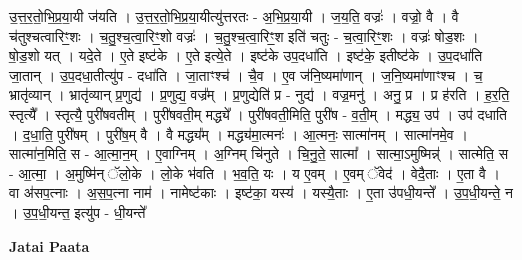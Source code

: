 \documentclass[17pt]{extarticle}
\begin{document}
उ॒त्त॒र॒तो॒भि॒प्र॒या॒यी ज॑यति । उ॒त्त॒र॒तो॒भि॒प्र॒या॒यीत्यु॑त्तरतः - अ॒भि॒प्र॒या॒यी । ज॒य॒ति॒ वज्रः॑ । वज्रो॒ वै । वै च॑तुश्चत्वारिꣳ॒॒शः । च॒तु॒श्च॒त्वा॒रिꣳ॒॒शो वज्रः॑ । च॒तु॒श्च॒त्वा॒रिꣳ॒॒श इति॑ चतुः - च॒त्वा॒रिꣳ॒॒शः । वज्रः॑ षोड॒शः । षो॒ड॒शो यत् । यदे॒ते । ए॒ते इष्ट॑के । ए॒ते इत्ये॒ते । इष्ट॑के उप॒दधा॑ति । इष्ट॑के॒ इतीष्ट॑के । उ॒प॒दधा॑ति जा॒तान् । उ॒प॒दधा॒तीत्यु॑प - दधा॑ति । जा॒ताꣳश्च॑ । चै॒व । ए॒व ज॑नि॒ष्यमा॑णान् । ज॒नि॒ष्यमा॑णाꣳश्च । च॒ भ्रातृ॑व्यान् । भ्रातृ॑व्यान् प्र॒णुद्य॑ । प्र॒णुद्य॒ वज्र᳚म् । प्र॒णुद्येति॑ प्र - नुद्य॑ । वज्र॒मनु॑ । अनु॒ प्र । प्र ह॑रति । ह॒र॒ति॒ स्तृत्यै᳚ । स्तृत्यै॒ पुरी॑षवतीम् । पुरी॑षवती॒म् मद्ध्ये᳚ । पुरी॑षवती॒मिति॒ पुरी॑ष - व॒ती॒म् । मद्ध्य॒ उप॑ । उप॑ दधाति । द॒धा॒ति॒ पुरी॑षम् । पुरी॑ष॒म् वै । वै मद्ध्य᳚म् । मद्ध्य॑मा॒त्मनः॑ । आ॒त्मनः॒ सात्मा॑नम् । सात्मा॑नमे॒व । सात्मा॑न॒मिति॒ स - आ॒त्मा॒न॒म् । ए॒वाग्निम् । अ॒ग्निम् चि॑नुते । चि॒नु॒ते॒ सात्मा᳚ । सात्मा॒ऽमुष्मिन्न्॑ । सात्मेति॒ स - आ॒त्मा॒ । अ॒मुष्मि॑न् ॅलो॒के । लो॒के भ॑वति । भ॒व॒ति॒ यः । य ए॒वम् । ए॒वम् ॅवेद॑ । वेदै॒ताः । ए॒ता वै । वा अ॑सप॒त्नाः । अ॒स॒प॒त्ना नाम॑ । नामेष्ट॑काः । इष्ट॑का॒ यस्य॑ । यस्यै॒ताः । ए॒ता उ॑पधी॒यन्ते᳚ । उ॒प॒धी॒यन्ते॒ न । उ॒प॒धी॒यन्त॒ इत्यु॑प - धी॒यन्ते᳚ \newline

\textbf{Jatai Paata} \newline
\end{document}
